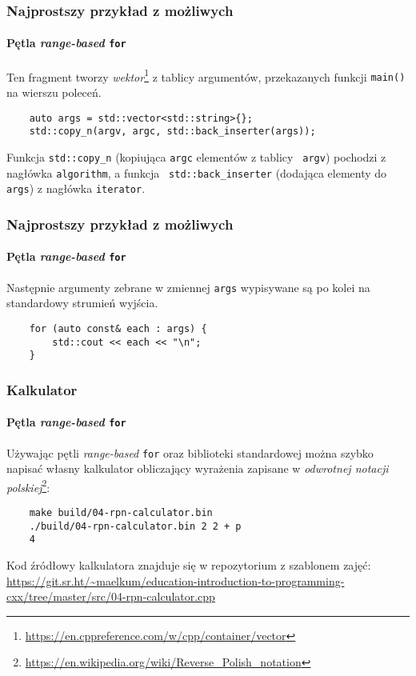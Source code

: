 \documentclass[aspectratio=169]{beamer}
\begin{document}
\begin{frame}[fragile]
    \frametitle{Najprostszy przykład z możliwych}
    \framesubtitle{Pętla \emph{range-based} {\tt for}}

    Ten fragment tworzy
    \emph{wektor}\footnote{\url{https://en.cppreference.com/w/cpp/container/vector}}
    z tablicy argumentów, przekazanych funkcji {\tt main()} na wierszu poleceń.

    {\footnotesize
    \begin{lstlisting}
    auto args = std::vector<std::string>{};
    std::copy_n(argv, argc, std::back_inserter(args));
    \end{lstlisting}}

    Funkcja {\tt std::copy\_n} (kopiująca {\tt argc} elementów z tablicy {\tt
    argv}) pochodzi z nagłówka {\tt algorithm}, a funkcja {\tt
    std::back\_inserter} (dodająca elementy do {\tt args}) z nagłówka
    {\tt iterator}.
\end{frame}

\begin{frame}[fragile]
    \frametitle{Najprostszy przykład z możliwych}
    \framesubtitle{Pętla \emph{range-based} {\tt for}}

    Następnie argumenty zebrane w zmiennej {\tt args} wypisywane są po kolei na
    standardowy strumień wyjścia.

    {\footnotesize
    \begin{lstlisting}
    for (auto const& each : args) {
        std::cout << each << "\n";
    }
    \end{lstlisting}}
\end{frame}

\begin{frame}[fragile]
    \frametitle{Kalkulator}
    \framesubtitle{Pętla \emph{range-based} {\tt for}}

    Używając pętli \emph{range-based} {\tt for} oraz biblioteki standardowej
    można szybko napisać własny kalkulator obliczający wyrażenia zapisane w
    \emph{odwrotnej notacji
    polskiej}\footnote{\url{https://en.wikipedia.org/wiki/Reverse_Polish_notation}}:

    \begin{lstlisting}
    make build/04-rpn-calculator.bin
    ./build/04-rpn-calculator.bin 2 2 + p
    4
    \end{lstlisting}

    {\tiny
    Kod źródłowy kalkulatora znajduje się w repozytorium z szablonem zajęć:
    \url{https://git.sr.ht/~maelkum/education-introduction-to-programming-cxx/tree/master/src/04-rpn-calculator.cpp}}
\end{frame}
\end{document}
